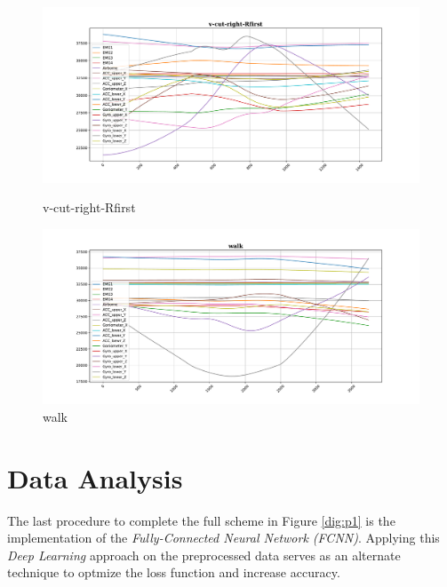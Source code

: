 \begin{figure}[!tbp]
	\begin{minipage}[b]{0.45\textwidth}
		\includegraphics[width=\textwidth]{images/v-cut-right-Rfirst_example.pdf}
		\caption{v-cut-right-Rfirst}
	\end{minipage}
	\begin{minipage}[b]{0.45\textwidth}
		\includegraphics[width=\textwidth]{images/walk_example.pdf}
		\caption{walk}
		\label{sm22}
	\end{minipage}
\end{figure}



\section{Data Analysis}

The last procedure to complete the full scheme in Figure \ref{dig:p1} is the implementation of the
\emph{Fully-Connected Neural Network (FCNN)}. Applying this \emph{Deep Learning} approach on the preprocessed
data serves as an alternate technique to optmize the loss function and increase accuracy.

